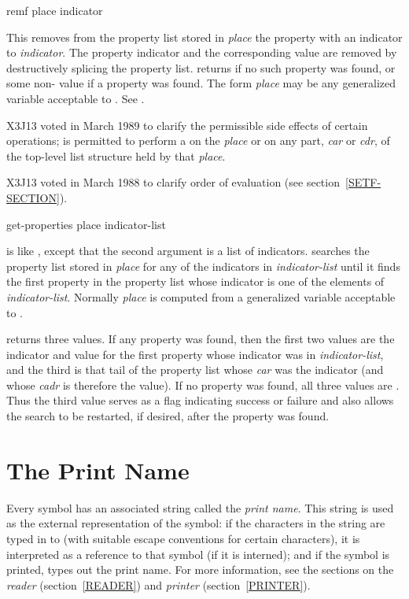 \begin{defmac}
remf place indicator

This removes from the property list stored in {\it place}
the property with an indicator 
to {\it indicator}.  The property indicator and the corresponding
value are removed by destructively splicing the property
list.   returns {\false} if no such property was found,
or some non-{\nil} value if a property was found.
The form {\it place} may be any generalized variable acceptable to .
See .

\begin{newer}
X3J13 voted in March 1989 
to clarify the permissible side effects of certain operations;
 is permitted to perform a 
on the {\it place} or on any part, {\it car} or {\it cdr}, of the
top-level list structure held by that {\it place}.
\end{newer}

\begin{newer}
X3J13 voted in March 1988 
to clarify order of evaluation (see section~\ref{SETF-SECTION}).
\end{newer}
\end{defmac}

\begin{defun}[Function]
get-properties place indicator-list

 is like , except that the second
argument is a list of indicators.   searches the
property list stored in {\it place} for any of the indicators in
{\it indicator-list} until it finds the first property
in the property list whose indicator is one of
the elements of {\it indicator-list}.  Normally {\it place} is computed from
a generalized variable acceptable to .

 returns three values.
If any property was found, then
the first two values are the indicator
and value for the first property whose indicator was in {\it indicator-list},
and the third is that tail of the property list whose {\it car}
was the indicator (and whose {\it cadr} is therefore the value).
If no property was found, all three values are {\nil}.
Thus the third value serves as a flag indicating success or failure
and also allows the search to be restarted, if desired, after the property
was found.
\end{defun}

\section{The Print Name}
Every symbol has an associated string called the {\it print name}.
This string is used as the external representation of the symbol:
if the characters in the string are typed in to 
(with suitable escape conventions for certain characters),
it is interpreted as a reference to that symbol
(if it is interned); and if the symbol is printed,  types out the
print name.
For more information, see the sections on the {\it reader}
(section~\ref{READER})
and {\it printer} (section~\ref{PRINTER}).

